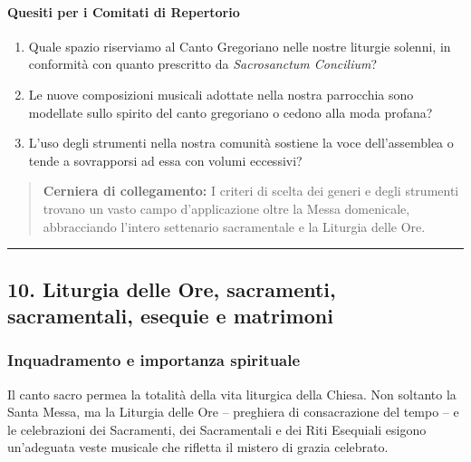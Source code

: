 \documentclass[12pt,a4paper]{article}
\begin{document}
	\paragraph{Quesiti per i Comitati di Repertorio}\label{quesiti-per-i-comitati-di-repertorio}
	
	\begin{enumerate}[label=\arabic*.,leftmargin=*]
		\item Quale spazio riserviamo al Canto Gregoriano nelle nostre liturgie solenni, in conformità con quanto prescritto da \emph{Sacrosanctum Concilium}?
		\item Le nuove composizioni musicali adottate nella nostra parrocchia sono modellate sullo spirito del canto gregoriano o cedono alla moda profana?
		\item L'uso degli strumenti nella nostra comunità sostiene la voce dell'assemblea o tende a sovrapporsi ad essa con volumi eccessivi?
	\end{enumerate}
	
	\begin{quote}
		\textbf{Cerniera di collegamento:} I criteri di scelta dei generi e degli strumenti trovano un vasto campo d'applicazione oltre la Messa domenicale, abbracciando l'intero settenario sacramentale e la Liturgia delle Ore.
	\end{quote}
	
	\begin{center}\rule{0.5\linewidth}{0.5pt}\end{center}
	
	\subsection{10. Liturgia delle Ore, sacramenti, sacramentali, esequie e matrimoni}\label{liturgia-delle-ore-sacramenti-sacramentali-esequie-e-matrimoni}
	
	\subsubsection{Inquadramento e importanza spirituale}\label{inquadramento-e-importanza-spirituale}
	
	Il canto sacro permea la totalità della vita liturgica della Chiesa. Non soltanto la Santa Messa, ma la Liturgia delle Ore -- preghiera di consacrazione del tempo -- e le celebrazioni dei Sacramenti, dei Sacramentali e dei Riti Esequiali esigono un'adeguata veste musicale che rifletta il mistero di grazia celebrato.
	
\end{document}
